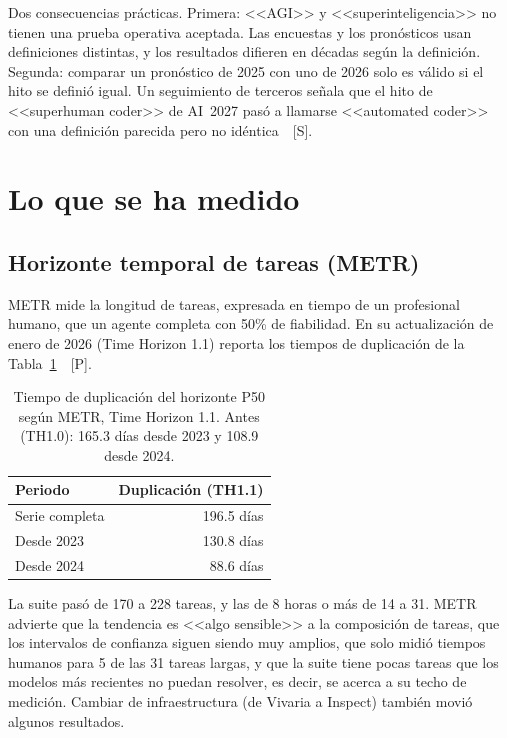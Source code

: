 \documentclass[10pt]{article}
\newcommand{\tP}{\textsf{\small[P]}}
\newcommand{\tS}{\textsf{\small[S]}}
\begin{document}
Dos consecuencias pr\'acticas. Primera: <<AGI>> y <<superinteligencia>> no tienen una prueba operativa aceptada. Las encuestas y los pron\'osticos usan definiciones distintas, y los resultados difieren en d\'ecadas seg\'un la definici\'on. Segunda: comparar un pron\'ostico de 2025 con uno de 2026 solo es v\'alido si el hito se defini\'o igual. Un seguimiento de terceros se\~nala que el hito de <<superhuman coder>> de AI~2027 pas\'o a llamarse <<automated coder>> con una definici\'on parecida pero no id\'entica~\cite{ai2027tracker}~\tS.

\section{Lo que se ha medido}

\subsection{Horizonte temporal de tareas (METR)}

METR mide la longitud de tareas, expresada en tiempo de un profesional humano, que un agente completa con 50\% de fiabilidad. En su actualizaci\'on de enero de 2026 (Time Horizon 1.1) reporta los tiempos de duplicaci\'on de la Tabla~\ref{tab:metr}~\cite{metr2026}~\tP.

\begin{table}[H]
\centering\small
\begin{tabular}{@{}lr@{}}
\toprule
Periodo & Duplicaci\'on (TH1.1) \\
\midrule
Serie completa & 196.5 d\'ias \\
Desde 2023 & 130.8 d\'ias \\
Desde 2024 & 88.6 d\'ias \\
\bottomrule
\end{tabular}
\caption{Tiempo de duplicaci\'on del horizonte P50 seg\'un METR, Time Horizon 1.1. Antes (TH1.0): 165.3 d\'ias desde 2023 y 108.9 desde 2024.}
\label{tab:metr}
\end{table}

La suite pas\'o de 170 a 228 tareas, y las de 8 horas o m\'as de 14 a 31. METR advierte que la tendencia es <<algo sensible>> a la composici\'on de tareas, que los intervalos de confianza siguen siendo muy amplios, que solo midi\'o tiempos humanos para 5 de las 31 tareas largas, y que la suite tiene pocas tareas que los modelos m\'as recientes no puedan resolver, es decir, se acerca a su techo de medici\'on. Cambiar de infraestructura (de Vivaria a Inspect) tambi\'en movi\'o algunos resultados.
\end{document}
